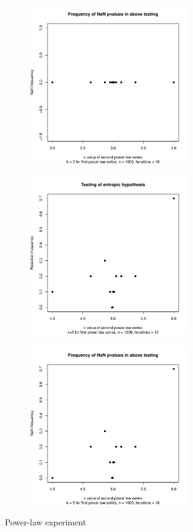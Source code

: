 \begin{figure}
\begin{subfigure}[b]{0.3\textwidth}
    \end{subfigure}
    \hfill
    \begin{subfigure}[b]{0.5\textwidth}
        \centering
        \includegraphics[height=7cm,keepaspectratio]{./powerlaw/NaNPlot,k1=3,n=1000,iterations=10.pdf}
    \end{subfigure}
    \vfill
    \begin{subfigure}[b]{0.3\textwidth}
        \centering
        \includegraphics[height=7cm,keepaspectratio]{./powerlaw/rejectionPlot,k1=5,n=1000,iterations=10.pdf}
    \end{subfigure}
    \hfill
    \begin{subfigure}[b]{0.5\textwidth}
        \centering
        \includegraphics[height=7cm,keepaspectratio]{./powerlaw/NaNPlot,k1=5,n=1000,iterations=10.pdf}
    \end{subfigure}
    \caption{Power-law experiment}
\end{figure}

